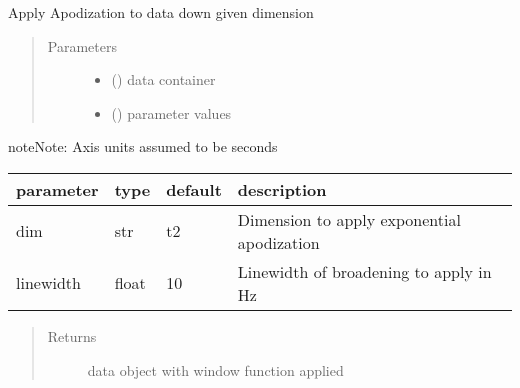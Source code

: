 \documentclass[letterpaper,10pt,english]{sphinxmanual}
\begin{document}
\begin{fulllineitems}
\label{\detokenize{dnpNMR:dnpLab.dnpNMR.window}}
Apply Apodization to data down given dimension
\begin{quote}\begin{description}
\item[{Parameters}] \leavevmode\begin{itemize}
\item {} 
 ({\hyperref[\detokenize{dnpData:dnpLab.dnpdata}]{}}\sphinxstyleliteralemphasis{\sphinxupquote{, }}) \sphinxhyphen{}\sphinxhyphen{} data container

\item {} 
 (\sphinxstyleliteralemphasis{\sphinxupquote{, }}) \sphinxhyphen{}\sphinxhyphen{} parameter values

\end{itemize}

\end{description}\end{quote}

\begin{sphinxadmonition}{note}{Note:}
Axis units assumed to be seconds
\end{sphinxadmonition}


\begin{savenotes}\sphinxattablestart
\centering
\begin{tabulary}{\linewidth}[t]{|T|T|T|T|}
\hline

parameter
&
type
&
default
&
description
\\
\hline
dim
&
str
&
\textquotesingle{}t2\textquotesingle{}
&
Dimension to apply exponential apodization
\\
\hline
linewidth
&
float
&
10
&
Linewidth of broadening to apply in Hz
\\
\hline
\end{tabulary}
\par
\sphinxattableend\end{savenotes}
\begin{quote}\begin{description}
\item[{Returns}] \leavevmode
data object with window function applied


\end{description}
\end{quote}
\end{fulllineitems}
\end{document}
